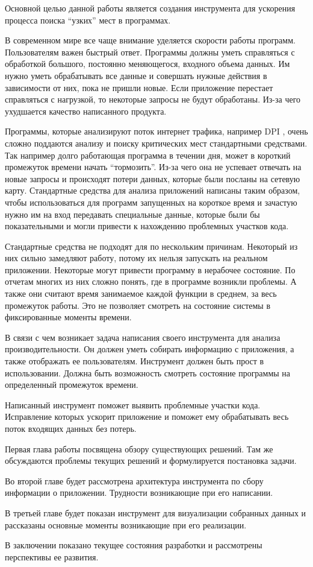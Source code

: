 \startprefacepage
	Основной целью данной работы является создания инструмента для ускорения процесса поиска \enquote{узких} мест в программах.  

	В современном мире все чаще внимание уделяется скорости работы программ. Пользователям важен быстрый ответ. Программы должны уметь справляться с обработкой большого, постоянно меняющегося, входного объема данных. Им нужно уметь обрабатывать все данные и совершать нужные действия в зависимости от них, пока не пришли новые. Если приложение перестает справляться с нагрузкой, то некоторые запросы не будут обработаны. Из-за чего ухудшается качество написанного продукта.

	Программы, которые анализируют поток интернет трафика, например DPI \cite{dpi}, очень сложно поддаются анализу и поиску критических мест стандартными средствами. Так например долго работающая программа в течении дня, может в короткий промежуток времени начать \enquote{тормозить}. Из-за чего она не успевает отвечать на новые запросы и происходят потери данных, которые были посланы на сетевую карту. Стандартные средства для анализа приложений написаны таким образом, чтобы использоваться для программ запущенных на короткое время и зачастую нужно им на вход передавать специальные данные, которые были бы показательными и могли привести к нахождению проблемных участков кода.

	Стандартные средства не подходят для  по нескольким причинам. Некоторый из них сильно замедляют работу, потому их нельзя запускать на реальном приложении. Некоторые могут привести программу в нерабочее состояние. По отчетам многих из них сложно понять, где в программе возникли проблемы. А также они считают время занимаемое каждой функции в среднем, за весь промежуток работы. Это не позволяет смотреть на состояние системы в фиксированные моменты времени.
    
    В связи с чем возникает задача написания своего инструмента для анализа производительности. Он должен уметь собирать информацию с приложения, а также отображать ее пользователям. Инструмент должен быть прост в использовании. Должна быть возможность смотреть состояние программы на определенный промежуток времени.  
    
    Написанный инструмент поможет выявить проблемные участки кода. Исправление которых ускорит приложение и поможет ему обрабатывать весь поток входящих данных без потерь.

	Первая глава работы посвящена обзору существующих решений. Там же обсуждаются проблемы текущих решений и формулируется постановка задачи. 

	Во второй главе будет рассмотрена архитектура инструмента по сбору информации о приложении. Трудности возникающие при его написании.

	В третьей главе будет показан инструмент для визуализации собранных данных и рассказаны основные моменты возникающие при его реализации.

В заключении  показано текущее состояния разработки и рассмотрены перспективы ее развития. 